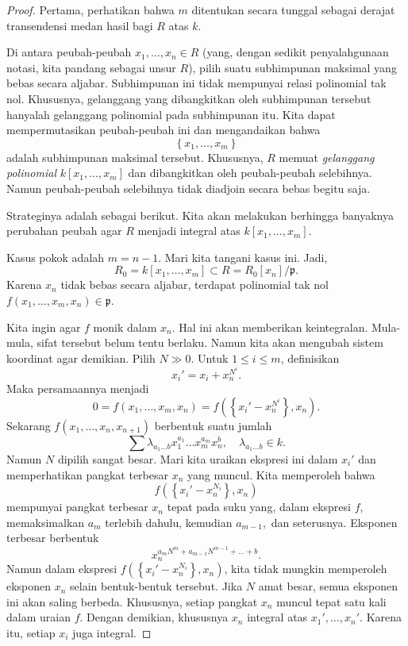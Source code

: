\begin{proof}
Pertama, perhatikan bahwa $m$ ditentukan secara tunggal sebagai derajat transendensi
medan hasil bagi $R$ atas $k$.

Di antara peubah-peubah $x_1, \dots, x_n \in R$ (yang, dengan sedikit penyalahgunaan notasi,
kita pandang sebagai unsur $R$), pilih suatu subhimpunan maksimal yang bebas secara aljabar.
Subhimpunan ini tidak mempunyai relasi polinomial tak nol. Khususnya, gelanggang
yang dibangkitkan oleh subhimpunan tersebut hanyalah gelanggang polinomial pada subhimpunan itu.
Kita dapat mempermutasikan peubah-peubah ini dan mengandaikan bahwa
$$\left\{x_1,\dots, x_m\right\}$$ adalah subhimpunan maksimal tersebut. Khususnya, $R$
memuat \emph{gelanggang polinomial} $k[x_1, \dots, x_m]$ dan dibangkitkan oleh
peubah-peubah selebihnya. Namun peubah-peubah selebihnya tidak diadjoin secara bebas
begitu saja.

Strateginya adalah sebagai berikut. Kita akan melakukan berhingga banyaknya perubahan
peubah agar $R$ menjadi integral atas $k[x_1, \dots, x_m]$.

Kasus pokok adalah $m=n-1$. Mari kita tangani kasus ini. Jadi,
\[ R_0 = k[x_1, \dots, x_m]  \subset R = R_0[x_n]/\mathfrak{p}.  \]
Karena $x_n$ tidak bebas secara aljabar, terdapat polinomial tak nol
$f(x_1, \dots, x_m, x_n) \in \mathfrak{p}$.

Kita ingin agar $f$ monik dalam $x_n$. Hal ini akan memberikan keintegralan. Mula-mula,
sifat tersebut belum tentu berlaku. Namun kita akan mengubah sistem koordinat agar demikian.
Pilih $N \gg 0$. Untuk $1 \leq i \leq m$, definisikan
\[ x_i' = x_i + x_n^{N^i}.  \]
Maka persamaannya menjadi
\[ 0 = f(x_1, \dots, x_m, x_n) = f( \left\{x_i' - x_n^{N^i}\right\} , x_n). \]
Sekarang $f(x_1, \dots, x_n, x_{n+1})$ berbentuk suatu jumlah
\[ \sum \lambda_{a_1 \dots b} x_1^{a_1} \dots x_m^{a_m} x_n^{b} , \quad
\lambda_{a_1 \dots b} \in k. \]
Namun $N$ dipilih sangat besar. Mari kita uraikan ekspresi ini dalam $x_i'$ dan
memperhatikan pangkat terbesar $x_n$ yang muncul.
Kita memperoleh bahwa
\[ f(\left\{x_i' - x_n^{N_i}\right\},x_n)
\]
mempunyai pangkat terbesar $x_n$ tepat pada suku yang, dalam ekspresi $f$,
memaksimalkan $a_m$ terlebih dahulu, kemudian
$a_{m-1}, $ dan seterusnya. Eksponen terbesar berbentuk
\[ x_n^{a_m N^m + a_{m-1}N^{m-1} + \dots + b}.	\]
Namun dalam ekspresi
\( f(\left\{x_i' - x_n^{N_i}\right\},x_n)\), kita tidak mungkin memperoleh eksponen $x_n$ selain bentuk-bentuk tersebut. Jika $N$ amat
besar, semua eksponen ini akan saling berbeda.
Khususnya, setiap pangkat $x_n$ muncul tepat satu kali dalam uraian
$f$. Dengan demikian, khususnya $x_n$ integral atas $x_1', \dots, x_n'$.
Karena itu, setiap $x_i$ juga integral.


\end{proof}
